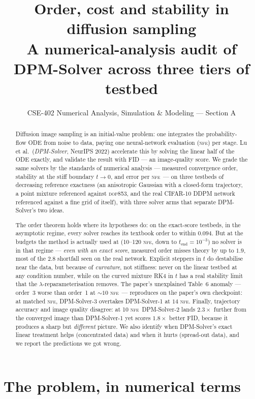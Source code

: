 \documentclass[11pt,a4paper]{article}
\title{\textbf{Order, cost and stability in diffusion sampling}\\[2pt]
\large A numerical-analysis audit of DPM-Solver across three tiers of testbed}
\author{CSE-402 Numerical Analysis, Simulation \& Modeling --- Section A}
\date{}
\newcommand{\NFE}{\textsc{nfe}}
\newcommand{\lam}{\lambda}
\begin{document}
\maketitle

\begin{abstract}
\noindent
Diffusion image sampling is an initial-value problem: one integrates the
probability-flow ODE from noise to data, paying one neural-network evaluation
(\NFE) per stage. Lu et al.\ (\emph{DPM-Solver}, NeurIPS 2022) accelerate this by
solving the linear half of the ODE exactly, and validate the result with FID --- an
image-quality score. We grade the same solvers by the standards of numerical
analysis --- measured convergence order, stability at the stiff boundary
$t\!\to\!0$, and error per \NFE\ --- on three testbeds of decreasing reference
exactness (an anisotropic Gaussian with a closed-form trajectory, a point mixture
referenced against \textsc{dop853}, and the real CIFAR-10 DDPM network referenced
against a fine grid of itself), with three solver arms that separate DPM-Solver's
two ideas.

The order theorem holds where its hypotheses do: on the exact-score testbeds, in
the asymptotic regime, every solver reaches its textbook order to within $0.094$.
But at the budgets the method is actually used at (10--120 \NFE, down to
$t_{\text{end}}=10^{-3}$) no solver is in that regime --- \emph{even with an exact
score}, measured order misses theory by up to $1.9$, most of the $2.8$ shortfall
seen on the real network. Explicit steppers in $t$ do destabilise near the data,
but because of \emph{curvature}, not stiffness: never on the linear testbed at any
condition number, while on the curved mixture RK4 in $t$ has a real stability
limit that the $\lam$-reparameterisation removes. The paper's unexplained Table~6
anomaly --- order~3 worse than order~1 at ${\sim}10$ \NFE\ --- reproduces on the
paper's own checkpoint: at matched \NFE, DPM-Solver-3 overtakes DPM-Solver-1 at
$14$ \NFE. Finally, trajectory accuracy and image quality disagree: at 10 \NFE\
DPM-Solver-2 lands $2.3\times$ further from the converged image than
DPM-Solver-1 yet scores $1.8\times$ better FID, because it produces a sharp but
\emph{different} picture. We also identify when DPM-Solver's exact linear
treatment helps (concentrated data) and when it hurts (spread-out data), and we
report the predictions we got wrong.
\end{abstract}

\section{The problem, in numerical terms}
\end{document}
